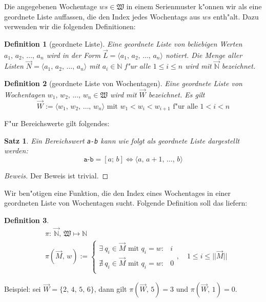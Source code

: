 \documentclass[a4paper]{article}
\newcommand*{\wkdays}{\mathfrak{W}}
\numberwithin{equation}{section}
\newtheorem{dfn}{Definition}
\newtheorem{thm}{Satz}
\begin{document}
\noindent Die angegebenen Wochentage $ws \in \wkdays$ in einem Serienmuster
k"onnen wir als eine geordnete Liste auf\mbox{}fassen, die den Index jedes
Wochentags aus $ws$ enth"alt. Dazu verwenden wir die folgenden Definitionen:
\begin{dfn}[geordnete Liste]
  Eine geordnete Liste von beliebigen Werten $a_1,\,a_2,\,\dots,\,a_n$ wird in
  der Form $\vec{L} = \langle a_1,\,a_2,\,\dots,\,a_n\rangle$ notiert. Die Menge
  aller Listen $\vec{N} = \langle a_1,\,a_2,\,\dots,\,a_n\rangle$ mit
  $a_i \in \mathbb{N}$ f"ur alle $1 \le i \le n$ wird mit $\vec{\mathbb{N}}$
  bezeichnet.
\end{dfn}
\begin{dfn}[geordnete Liste von Wochentagen]
  Eine geordnete Liste von Wochentagen $w_1,\,w_2,\,\ldots,\,w_n \in \wkdays$
  wird mit $\vec{W}$ bezeichnet. Es gilt
  \begin{equation}
    \vec{W} := \langle w_1,\,w_2,\,\dots,\,w_n\rangle\textrm{ mit }
    w_1 < w_i < w_{i+1} \textrm{ f"ur alle } 1 < i < n
  \end{equation}
\end{dfn}

\noindent F"ur Bereichswerte gilt folgendes:
\begin{thm}
  Ein Bereichswert \texttt{a-b} kann wie folgt als geordnete Liste dargestellt
  werden:
  \begin{equation}
    \texttt{a-b} = [a;\,b] \iff \langle a,\,a+1,\,\dots,\,b\rangle
  \end{equation}
\end{thm}
\begin{proof}[Beweis]Der Beweis ist trivial.\end{proof}

\noindent Wir ben"otigen eine Funktion, die den Index eines Wochentages in einer
geordneten Liste von Wochentagen sucht. Folgende Definition soll das
liefern:
\begin{dfn}
  \begin{equation}
  \begin{split}
    & \pi :\ \vec{\mathbb{N}},\,\wkdays \mapsto \mathbb{N} \\
    & \pi(\vec{M},\,w) := \left\{\begin{array}{ll}
    \exists\ q_i \in \vec{M} \textrm{ mit } q_i = w : & i \\
    \nexists\ q_i \in \vec{M} \textrm{ mit } q_i = w : & 0 \\
    \end{array}\right.,\quad
    1 \le i \le ||\vec{M}||
  \end{split}
  \end{equation}
\end{dfn}
\noindent Beispiel: sei $\vec{W} = \{2,\,4,\,5,\,6\}$, dann gilt
$\pi(\vec{W},\,5) = 3$ und $\pi(\vec{W},\,1) = 0$.
\end{document}
